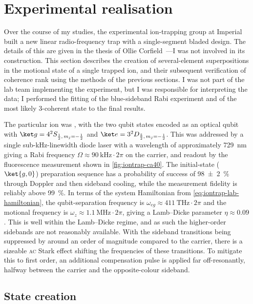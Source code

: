 \section{Experimental realisation}

Over the course of my studies, the experimental ion-trapping group at Imperial built a new linear radio-frequency trap with a single-segment bladed design.
The details of this are given in the thesis of Ollie Corfield~\cite{Corfield2022}---I was not involved in its construction.
This section describes the creation of several-element superpositions in the motional state of a single trapped ion, and their subsequent verification of coherence rank using the methods of the previous sections.
I was not part of the lab team implementing the experiment, but I was responsible for interpreting the data; I performed the fitting of the blue-sideband Rabi experiment and of the most likely 3-coherent state to the final results.

The particular ion was , with the two qubit states encoded as an optical qubit with $\ket g = 4^2S_{\frac12,\,m_j=-\frac12}$ and $\ket e = 3^2D_{\frac52,\,m_j=-\frac12}$.
This was addressed by a single sub-kHz-linewidth diode laser with a wavelength of approximately \qty{729}{\nano\m} giving a Rabi frequency $\Omega\approx\qty{90}{\kilo\Hz}\cdot2\pi$ on the carrier, and readout by the fluorescence measurement shown in \cref{fig:iontrap-ca40}.
The initial-state ($\ket{g,0}$) preparation sequence has a probability of success of \qty{98(2)}{\percent} through Doppler and then sideband cooling, while the measurement fidelity is reliably above \qty{99}{\percent}.
In terms of the system Hamiltonian from \cref{eq:iontrap-lab-hamiltonian}, the qubit-separation frequency is $\omega_{eg}\approx\qty{411}{\tera\Hz}\cdot2\pi$ and the motional frequency is $\omega_z\approx\qty{1.1}{\mega\Hz}\cdot2\pi$, giving a Lamb--Dicke parameter $\eta \approx 0.09$.
This is well within the Lamb--Dicke regime, and as such the higher-order sidebands are not reasonably available.
With the sideband transitions being suppressed by around an order of magnitude compared to the carrier, there is a sizeable \textsc{ac} Stark effect shifting the frequencies of these transitions.
To mitigate this to first order, an additional compensation pulse is applied far off-resonantly, halfway between the carrier and the opposite-colour sideband.

\subsection{State creation}
\label{sec:coherence-experiment-state-creation}

